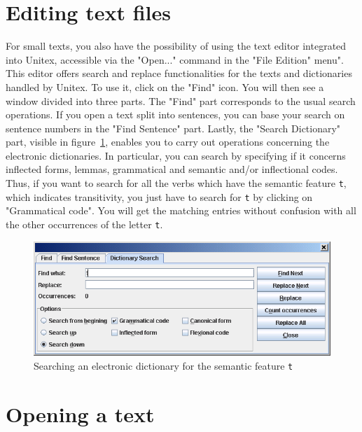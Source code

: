 \section{Editing text files}
For small texts, you also have the possibility of using the text editor integrated into Unitex,
accessible via the "Open..." command in the "File Edition" menu".
 This editor offers search and replace
functionalities  for the texts and dictionaries handled by Unitex. To use it,
click on the "Find" icon. You will then see a window  divided into three parts.
The "Find" part corresponds to the usual search operations. If you open a text
split into sentences, you can base your search on sentence numbers 
in the "Find Sentence" part. Lastly, the "Search Dictionary" part,
visible in figure~\ref{dictionary-search}, enables you to carry out operations
concerning the electronic dictionaries. In particular, you can   search by
specifying if it concerns  inflected forms, lemmas, grammatical and semantic
and/or inflectional codes. Thus, if you want to search for all the verbs which
have the  semantic feature \verb$t$, which indicates
transitivity, you just have to search for  \verb$t$ by clicking on "Grammatical
code". You will get the matching entries without confusion  with all the other
occurrences of the letter \verb$t$.


\begin{figure}[!ht]
\begin{center}
\includegraphics[width=15cm]{resources/img/fig2-6.png}
\caption{Searching an electronic dictionary for the semantic feature \texttt{t}\label{dictionary-search}}
\end{center}
\end{figure}


\section{Opening a text}

